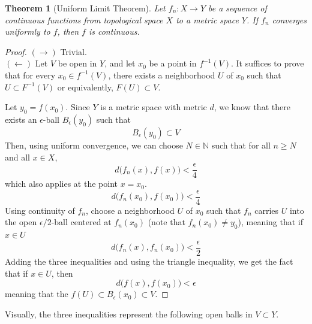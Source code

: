 \documentclass{article}
\newtheorem{theorem}{Theorem}[section]
\theoremstyle{remark}
\theoremstyle{definition}
\begin{document}
\begin{theorem}[Uniform Limit Theorem]
Let $f_n: X \longrightarrow Y$ be a sequence of continuous functions from topological space $X$ to a metric space $Y$. If $f_n$ converges uniformly to $f$, then $f$ is continuous. 
\end{theorem}
\begin{proof}
$(\rightarrow)$ Trivial. \\
$(\leftarrow)$ Let $V$ be open in $Y$, and let $x_0$ be a point in $f^{-1} (V)$. It suffices to prove that for every $x_0 \in f^{-1} (V)$, there exists a neighborhood $U$ of $x_0$ such that $U \subset F^{-1} (V)$ or equivalently, $F(U) \subset V$. 

Let $y_0 = f(x_0)$. Since $Y$ is a metric space with metric $d$, we know that there exists an $\epsilon$-ball $B_\epsilon (y_0)$ such that
\[B_\epsilon (y_0) \subset V\]
Then, using uniform convergence, we can choose $N \in \mathbb{N}$ such that for all $n \geq N$ and all $x \in X$, 
\[d \big( f_n (x), f(x) \big) < \frac{\epsilon}{4}\]
which also applies at the point $x = x_0$. 
\[d \big( f_n (x_0), f(x_0) \big) < \frac{\epsilon}{4}\]
Using continuity of $f_n$, choose a neighborhood $U$ of $x_0$ such that $f_n$ carries $U$ into the open $\epsilon/2$-ball centered at $f_n (x_0)$ (note that $f_n (x_0) \neq y_0$), meaning that if $x \in U$
\[d \big( f_n (x), f_n (x_0) \big) < \frac{\epsilon}{2}\]
Adding the three inequalities and using the triangle inequality, we get the fact that if $x \in U$, then 
\[d \big( f(x), f(x_0) \big) < \epsilon\]
meaning that the $f(U) \subset B_\epsilon (x_0) \subset V$. 
\end{proof}

Visually, the three inequalities represent the following open balls in $V \subset Y$.
\begin{center}
\end{center}
\end{document}
